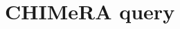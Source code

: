 \documentclass{standalone}
\begin{document}
\section[CHIMeRA query]{CHIMeRA query}\label{query}

\end{document}
